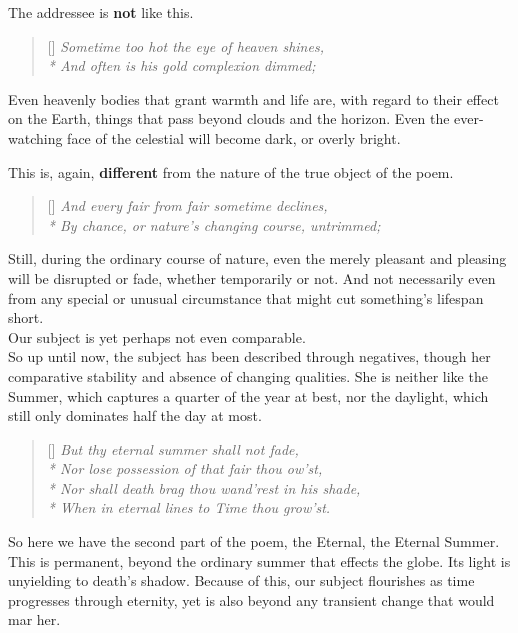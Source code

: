 \documentclass[]{article}
\begin{document}
The addressee is \textbf{not} like this.

\begin{verse}[\versewidth]
	\itshape
	Sometime too hot the eye of heaven shines,\\*
	And often is his gold complexion dimmed;\\
\end{verse}

Even heavenly bodies that grant warmth and life are, with regard to their effect on the Earth, things that pass beyond clouds and the horizon. Even the ever-watching face of the celestial will become dark, or overly bright.

This is, again, \textbf{different} from the nature of the true object of the poem.

\begin{verse}[\versewidth]
	\itshape
	And every fair from fair sometime declines,\\*
	By chance, or nature’s changing course, untrimmed;\\
\end{verse}


Still, during the ordinary course of nature, even the merely pleasant and pleasing will be disrupted or fade, whether temporarily or not. And not necessarily even from any special or unusual circumstance that might cut something's lifespan short.\\

Our subject is yet perhaps not even comparable.\\

So up until now, the subject has been described through negatives, though her comparative stability and absence of changing qualities. She is neither like the Summer, which captures a quarter of the year at best, nor the daylight, which still only dominates half the day at most.\\

\begin{verse}[\versewidth]
	\itshape
	But thy eternal summer shall not fade,\\*
	Nor lose possession of that fair thou ow’st,\\*
	Nor shall death brag thou wand’rest in his shade,\\*
	When in eternal lines to Time thou grow’st.\\
\end{verse}

So here we have the second part of the poem, the Eternal, the Eternal Summer. This is permanent, beyond the ordinary summer that effects the globe. Its light is unyielding to death's shadow. Because of this, our subject flourishes as time progresses through eternity, yet is also beyond any transient change that would mar her.
\end{document}
